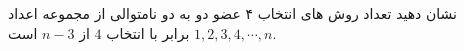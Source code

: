 \p
نشان دهید تعداد روش های انتخاب ۴ عضو دو به دو  نامتوالی از مجموعه اعداد
$1, 2, 3, 4, \cdots, n$
			 برابر با 
			 انتخاب
			  $4$
			  از
			  $n-3$
			  است.